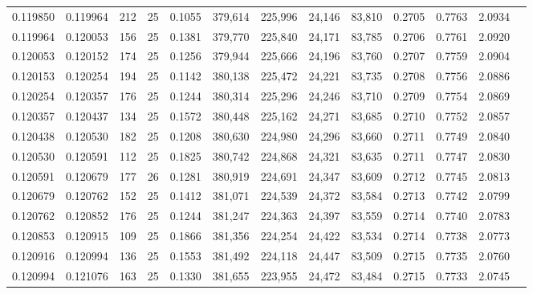 \begin{tabular}{rrrrrrrrrrrrr}
0.119850 & 0.119964 &   212 &  25 &                                     0.1055 & 379,614 & 225,996 &  24,146 &  83,810 & 0.2705 & 0.7763 & 2.0934 \\
0.119964 & 0.120053 &   156 &  25 &                                     0.1381 & 379,770 & 225,840 &  24,171 &  83,785 & 0.2706 & 0.7761 & 2.0920 \\
0.120053 & 0.120152 &   174 &  25 &                                     0.1256 & 379,944 & 225,666 &  24,196 &  83,760 & 0.2707 & 0.7759 & 2.0904 \\
0.120153 & 0.120254 &   194 &  25 &                                     0.1142 & 380,138 & 225,472 &  24,221 &  83,735 & 0.2708 & 0.7756 & 2.0886 \\
0.120254 & 0.120357 &   176 &  25 &                                     0.1244 & 380,314 & 225,296 &  24,246 &  83,710 & 0.2709 & 0.7754 & 2.0869 \\
0.120357 & 0.120437 &   134 &  25 &                                     0.1572 & 380,448 & 225,162 &  24,271 &  83,685 & 0.2710 & 0.7752 & 2.0857 \\
0.120438 & 0.120530 &   182 &  25 &                                     0.1208 & 380,630 & 224,980 &  24,296 &  83,660 & 0.2711 & 0.7749 & 2.0840 \\
0.120530 & 0.120591 &   112 &  25 &                                     0.1825 & 380,742 & 224,868 &  24,321 &  83,635 & 0.2711 & 0.7747 & 2.0830 \\
0.120591 & 0.120679 &   177 &  26 &                                     0.1281 & 380,919 & 224,691 &  24,347 &  83,609 & 0.2712 & 0.7745 & 2.0813 \\
0.120679 & 0.120762 &   152 &  25 &                                     0.1412 & 381,071 & 224,539 &  24,372 &  83,584 & 0.2713 & 0.7742 & 2.0799 \\
0.120762 & 0.120852 &   176 &  25 &                                     0.1244 & 381,247 & 224,363 &  24,397 &  83,559 & 0.2714 & 0.7740 & 2.0783 \\
0.120853 & 0.120915 &   109 &  25 &                                     0.1866 & 381,356 & 224,254 &  24,422 &  83,534 & 0.2714 & 0.7738 & 2.0773 \\
0.120916 & 0.120994 &   136 &  25 &                                     0.1553 & 381,492 & 224,118 &  24,447 &  83,509 & 0.2715 & 0.7735 & 2.0760 \\
0.120994 & 0.121076 &   163 &  25 &                                     0.1330 & 381,655 & 223,955 &  24,472 &  83,484 & 0.2715 & 0.7733 & 2.0745 \\

\end{tabular}
